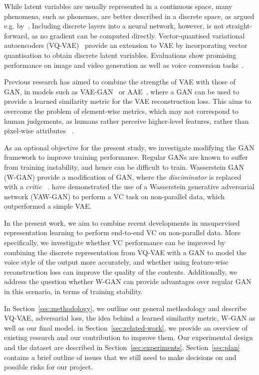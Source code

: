 \documentclass{article}
\begin{document}
While latent variables are usually represented in a continuous space, many phenomena, such as phonemes, are better described in a discrete space, as argued e.g.  by~\cite{VandenOord2017}. Including discrete layers into a neural network, however, is not straight-forward, as no gradient can be computed directly. Vector-quantised variational autoencoders (VQ-VAE)~\cite{VandenOord2017} provide an extension to VAE by incorporating vector quantisation to obtain discrete latent variables. Evaluations show promising performance on image and video generation as well as voice conversion tasks~\cite{VandenOord2017}. %

Previous research has aimed to combine the strengths of VAE with those of GAN, in models such as VAE-GAN~\cite{Larsen2015} or AAE~\cite{Makhzani2015}, where a GAN can be used to provide a learned similarity metric for the VAE reconstruction loss. This aims to overcome the problem of element-wise metrics, which may not correspond to human judgements, as humans rather perceive higher-level features, rather than pixel-wise attributes ~\citep{Larsen2015}. 

As an optional objective for the present study, we investigate modifying the GAN framework to improve training performance. Regular GANs are known to suffer from training instability, and hence can be difficult to train. Wasserstein GAN (W-GAN) provide a modification of GAN, where the \textit{disciminator} is replaced with a \textit{critic} ~\citep{Arjovsky2017}. \cite{Hsu2017} have demonstrated the use of a Wasserstein generative adversarial network (VAW-GAN) to perform a VC task on non-parallel data, which outperformed a simple VAE. 

In the present work, we aim to combine recent developments in unsupervised representation learning to perform end-to-end VC on non-parallel data. More specifically, we investigate whether VC performance can be improved by combining the discrete representation from VQ-VAE with a GAN to model the voice style of the output more accurately, and whether using feature-wise reconstruction loss can improve the quality of the contents. Additionally, we address the question whether W-GAN can provide advantages over regular GAN in this scenario, in terms of training stability. 

In Section~\ref{sec:methodology}, we outline our general methodology and describe VQ-VAE, adversarial loss, the idea behind a learned similarity metric, W-GAN as well as our final model. in Section~\ref{sec:related-work}, we provide an overview of existing research and our contribution to improve them. Our experimental design and the dataset are described in Section~\ref{sec:experiments}. 
Section~\ref{sec:plan} contains a brief outline of issues that we still need to make decisions on and possible risks for our project. 
\end{document}
